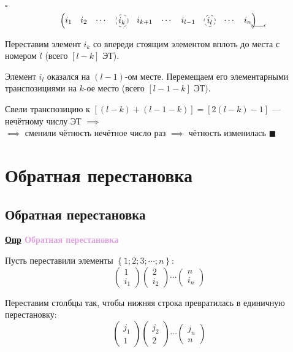 \documentclass[12pt, a4paper]{report}
\newcommand{\tikzmark}[2]{\tikz[remember picture,baseline=-2pt]\node[circle, dashed,black,draw,text=black,anchor=center,inner sep=1pt] (#1) {$#2$};}
\newcommand{\df}[1][]{\begin{flushleft}\textbf{\underline{Опр} \textcolor{Plum}{#1}}\end{flushleft}}
\begin{document}
	$\square$
	\[
	\begin{pmatrix} i_1&i_2&\cdots&\tikzmark{a}{i_k}&i_{k+1}&\cdots&i_{l-1}&\tikzmark{b}{i_l}&\cdots&i_n\end{pmatrix}
	\begin{tikzpicture}[overlay, remember picture]
		\draw[<->, black] (a) to [out=340, in=200](b);
	\end{tikzpicture}
	\]
	
	Переставим элемент $i_k$ со впереди стоящим элементом вплоть до места с номером $l$ (всего $[l-k]$ ЭТ).
	
	Элемент $i_l$ оказался на $(l-1)$-ом месте. Перемещаем его элементарными транспозициями на $k$-ое место (всего $[l-1-k]$ ЭТ).
	
	Свели транспозицию к $\left[(l-k)+(l-1-k)\right] = \left[2(l-k)-1\right]$ --- нечётному числу ЭТ $\implies$\\$\implies$ сменили чётность нечётное число раз $\implies$ чётность изменилась $\blacksquare$
	\section{Обратная перестановка}
	\subsection{Обратная перестановка}
	\df[Обратная перестановка]
	
	Пусть переставили элементы $\left\{1;2;3;\dotsb;n\right\}$:
	\[\begin{pmatrix} 1\\i_1\end{pmatrix}\begin{pmatrix} 2\\i_2\end{pmatrix}\dotsb\begin{pmatrix} n\\i_n\end{pmatrix}\]
	
	Переставим столбцы так, чтобы нижняя строка превратилась в единичную перестановку:
	\[\begin{pmatrix} j_1\\1\end{pmatrix}\begin{pmatrix} j_2\\2\end{pmatrix}\cdots\begin{pmatrix} j_n\\n\end{pmatrix}\]
	
\end{document}
